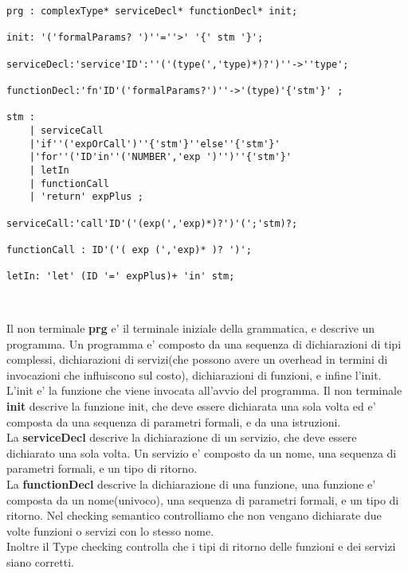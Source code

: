 \documentclass[../../main.tex]{subfiles}
\begin{document}
\begin{lstlisting}[language=ANTLR, caption={Grammatica del linguaggio HLCostLan}, label={lst:grammatica}]
prg : complexType* serviceDecl* functionDecl* init;
    
init: '('formalParams? ')''=''>' '{' stm '}';
    
serviceDecl:'service'ID':''('(type(','type)*)?')''->''type';
    
functionDecl:'fn'ID'('formalParams?')''->'(type)'{'stm'}' ;
    
stm :
    | serviceCall
    |'if''('expOrCall')''{'stm'}''else''{'stm'}'
    |'for''('ID'in''('NUMBER','exp ')'')''{'stm'}'  
    | letIn
    | functionCall
    | 'return' expPlus ;
    
serviceCall:'call'ID'('(exp(','exp)*)?')'(';'stm)?;

functionCall : ID'('( exp (','exp)* )? ')';

letIn: 'let' (ID '=' expPlus)+ 'in' stm;
                                   
    
    \end{lstlisting}
Il non terminale \textbf{prg} e' il terminale iniziale della grammatica, e descrive un programma. Un programma e' composto da una sequenza di dichiarazioni di tipi complessi, dichiarazioni di servizi(che possono avere un overhead in termini di invocazioni che influiscono sul costo), dichiarazioni di funzioni, e infine l'init. L'init e' la funzione che viene invocata all'avvio del programma.
Il non terminale \textbf{init} descrive la funzione init, che deve essere dichiarata una sola volta ed e' composta da una sequenza di parametri formali, e da una istruzioni.\\
La \textbf{serviceDecl} descrive la dichiarazione di un servizio, che deve essere dichiarato una sola volta. Un servizio e' composto da un nome, una sequenza di parametri formali, e un tipo di ritorno.\\
La \textbf{functionDecl} descrive la dichiarazione di una funzione, una funzione e' composta da un nome(univoco), una sequenza di parametri formali, e un tipo di ritorno.
Nel checking semantico controlliamo che non vengano dichiarate due volte funzioni o servizi con lo stesso nome.\\
Inoltre il Type checking controlla che i tipi di ritorno delle funzioni e dei servizi siano corretti.\\
\end{document}
